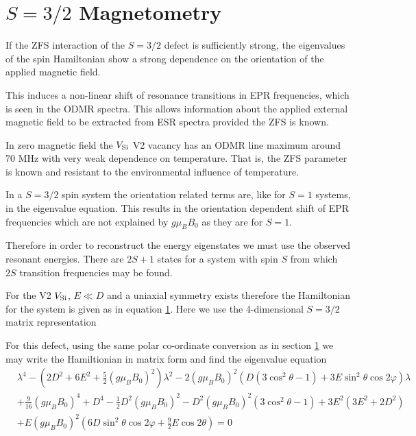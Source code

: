 \section{$S = 3/2$ Magnetometry}
\cite{PhysRevApplied.4.014009}
\cite{PhysRevB.92.115201}
\cite{1505.06914}

If the ZFS interaction of the $S=3/2$ defect is sufficiently strong, the eigenvalues of the
spin Hamiltonian show a strong dependence on the orientation of the applied magnetic field. 

This induces a non-linear shift of resonance transitions in EPR frequencies, which is seen in the ODMR spectra. 
This allows information about the applied external magnetic field to be extracted from ESR spectra provided the ZFS is known. 

In zero magnetic field the $V_{\ce{Si}}$ V2 vacancy has an ODMR line maximum around 70 MHz with very weak dependence on temperature. That is, the ZFS parameter is known and resistant to the environmental influence of temperature. 

In a $S=3/2$ spin system the orientation related terms are, like for $S=1$ systems, in the eigenvalue equation. 
This results in the orientation dependent shift of EPR frequencies which are not explained by $g \mu_B B_0$ as they are for $S=1$. 

Therefore in order to reconstruct the energy eigenstates we must use the observed resonant energies. There are $2S +1 $ states for a system with spin $S$ from which $2S$ transition frequencies may be found. 



For the V2 $V_{\ce{Si}}$, $E \ll D$ and a uniaxial symmetry exists therefore the Hamiltonian for the system is given as in equation \ref{}. Here we use the 4-dimensional $S=3/2$ matrix representation 
\begin{equation}
    \label{eq:}
\end{equation}

    For this defect, using the same polar co-ordinate conversion as in section \ref{} we may write the Hamiltionian in matrix form  and find the eigenvalue equation 
\begin{equation}
    \begin{align}
    &\lambda^4 - \left(2D^2 + 6E^2  + \frac{5}{2}(g\mu_B B_0)^2 \right)\lambda^2 - 2 (g \mu_B B_0)^2 \left(D(3 \cos^2 \theta -1) + 3E \sin^2\theta \cos 2\varphi \right)\lambda \\ 
    &+\frac{9}{16}(g \mu_B B_0)^4 + D^4 - \frac{1}{2}D^2 (g \mu_B B_0)^2 - D^2 (g \mu_B B_0)^2 (3 \cos^2 \theta - 1) + 3E^2(3E^2 + 2D^2) \\ 
    &+ E(g\mu_BB_0)^2 (6D \sin^2\theta \cos 2\varphi + \frac{9}{2}E \cos2\theta) = 0 
    \end{align} 
    \label{eq:V2_eigenvalue_equation}
\end{equation}
 
